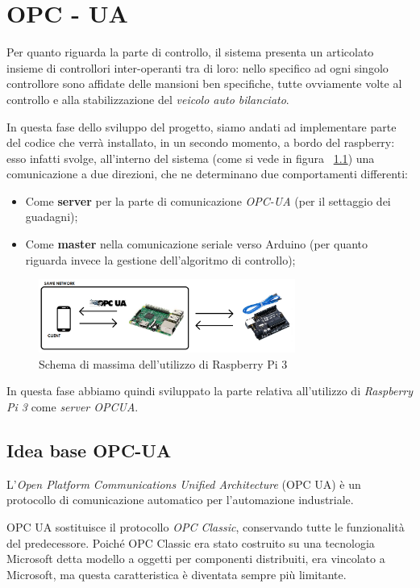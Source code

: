 \chapter{OPC - UA}
Per quanto riguarda la parte di controllo, il sistema presenta un articolato insieme di controllori inter-operanti tra di loro: nello specifico ad ogni singolo controllore sono affidate delle mansioni ben specifiche, tutte ovviamente volte al controllo e alla stabilizzazione del \textit{veicolo auto bilanciato}.

In questa fase dello sviluppo del progetto, siamo andati ad implementare parte del codice che verrà installato, in un secondo momento, a bordo del raspberry: esso infatti svolge, all'interno del sistema (come si vede in figura ~\ref{fig:OPCUA_schema}) una comunicazione a due direzioni, che ne determinano due comportamenti differenti:
\begin{itemize}
	\item Come \textbf{server} per la parte di comunicazione \textit{OPC-UA} (per il settaggio dei guadagni);
	\item Come \textbf{master} nella comunicazione seriale verso Arduino (per quanto riguarda invece la gestione dell'algoritmo di controllo);
\end{itemize}

 \begin{figure}[H]
	\centering   	
	\includegraphics[width=0.75\textwidth]{Immagini/OPCUA_schema.png}
	\caption{Schema di massima dell'utilizzo di Raspberry Pi 3}
	\label{fig:OPCUA_schema}
\end{figure}

In questa fase abbiamo quindi sviluppato la parte relativa all'utilizzo di \textit{Raspberry Pi 3} come \textit{server OPCUA}.

\section{Idea base OPC-UA}
L'\textit{Open Platform Communications Unified Architecture} (OPC UA) è un protocollo di comunicazione automatico per l'automazione industriale. 

OPC UA sostituisce il protocollo \textit{OPC Classic}, conservando tutte le funzionalità del predecessore. Poiché OPC Classic era stato costruito su una tecnologia Microsoft detta modello a oggetti per componenti distribuiti, era vincolato a Microsoft, ma questa caratteristica è diventata sempre più limitante.

